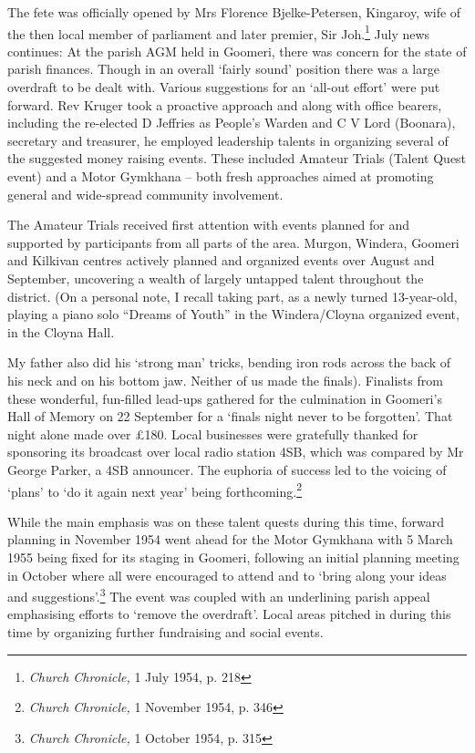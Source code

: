 The fete was officially opened by Mrs Florence Bjelke-Petersen, Kingaroy, wife of the then local member of parliament and later premier, Sir Joh.\footnote{\emph{Church Chronicle,} 1 July 1954, p. 218} July news continues: At the parish AGM held in Goomeri, there was concern for the state of parish finances. Though in an overall `fairly sound' position there was a large overdraft to be dealt with. Various suggestions for an `all-out effort' were put forward. Rev Kruger took a proactive approach and along with office bearers, including the re-elected D Jeffries as People's Warden and C V Lord (Boonara), secretary and treasurer, he employed leadership talents in organizing several of the suggested money raising events. These included Amateur Trials (Talent Quest event) and a Motor Gymkhana -- both fresh approaches aimed at promoting general and wide-spread community involvement.

The Amateur Trials received first attention with events planned for and supported by participants from all parts of the area. Murgon, Windera, Goomeri and Kilkivan centres actively planned and organized events over August and September, uncovering a wealth of largely untapped talent throughout the district. (On a personal note, I recall taking part, as a newly turned 13-year-old, playing a piano solo ``Dreams of Youth'' in the Windera/Cloyna organized event, in the Cloyna Hall.

My father also did his `strong man' tricks, bending iron rods across the back of his neck and on his bottom jaw. Neither of us made the finals). Finalists from these wonderful, fun-filled lead-ups gathered for the culmination in Goomeri's Hall of Memory on 22 September for a `finals night never to be forgotten'. That night alone made over £180. Local businesses were gratefully thanked for sponsoring its broadcast over local radio station 4SB, which was compared by Mr George Parker, a 4SB announcer. The euphoria of success led to the voicing of `plans' to `do it again next year' being forthcoming.\footnote{\emph{Church Chronicle,} 1 November 1954, p. 346}

While the main emphasis was on these talent quests during this time, forward planning in November 1954 went ahead for the Motor Gymkhana with 5 March 1955 being fixed for its staging in Goomeri, following an initial planning meeting in October where all were encouraged to attend and to `bring along your ideas and suggestions'.\footnote{\emph{Church Chronicle,} 1 October 1954, p. 315} The event was coupled with an underlining parish appeal emphasising efforts to `remove the overdraft'. Local areas pitched in during this time by organizing further fundraising and social events.

